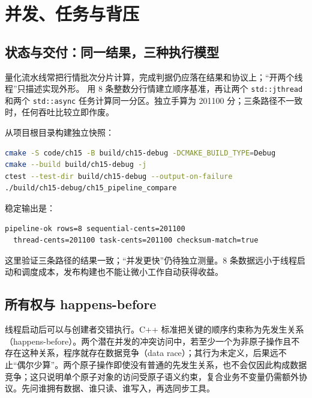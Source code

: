 \chapter{并发、任务与背压}


\section{状态与交付：同一结果，三种执行模型}

量化流水线常把行情批次分片计算，完成判据仍应落在结果和协议上；“开两个线程”只描述实现外形。 用 8 条整数分行情建立顺序基准，再让两个 \texttt{std::jthread} 和两个 \texttt{std::async} 任务计算同一分区。独立手算为 201100 分；三条路径不一致时，任何吞吐比较立即作废。

从项目根目录构建独立快照：

\begin{lstlisting}[language=bash,numbers=none]
cmake -S code/ch15 -B build/ch15-debug -DCMAKE_BUILD_TYPE=Debug
cmake --build build/ch15-debug -j
ctest --test-dir build/ch15-debug --output-on-failure
./build/ch15-debug/ch15_pipeline_compare
\end{lstlisting}

稳定输出是：

\begin{lstlisting}[numbers=none]
pipeline-ok rows=8 sequential-cents=201100
  thread-cents=201100 task-cents=201100 checksum-match=true
\end{lstlisting}

这里验证三条路径的结果一致；“并发更快”仍待独立测量。8 条数据远小于线程启动和调度成本，发布构建也不能让微小工作自动获得收益。

\section{所有权与 happens-before}

线程启动后可以与创建者交错执行。C++ 标准把关键的顺序约束称为先发生关系（happens-before）。两个潜在并发的冲突访问中，若至少一个为非原子操作且不存在这种关系，程序就存在数据竞争（data race）；其行为未定义，后果远不止“偶尔少算”\autocite{cppdraft,williams2019concurrency}。两个原子操作即使没有普通的先发生关系，也不会仅因此构成数据竞争；这只说明单个原子对象的访问受原子语义约束，复合业务不变量仍需额外协议。先问谁拥有数据、谁只读、谁写入，再选同步工具。

